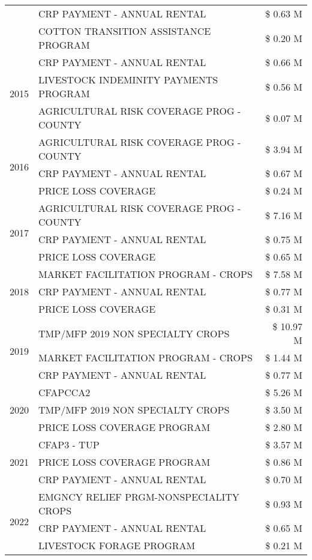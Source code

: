 \begin{tabular}{llr}
 & CRP PAYMENT - ANNUAL RENTAL & \$ 0.63 M \\
 & COTTON TRANSITION ASSISTANCE PROGRAM & \$ 0.20 M \\
\cline{1-3}
\multirow[t]{3}{*}{2015} & CRP PAYMENT - ANNUAL RENTAL & \$ 0.66 M \\
 & LIVESTOCK INDEMINITY PAYMENTS PROGRAM & \$ 0.56 M \\
 & AGRICULTURAL RISK COVERAGE PROG - COUNTY & \$ 0.07 M \\
\cline{1-3}
\multirow[t]{3}{*}{2016} & AGRICULTURAL RISK COVERAGE PROG - COUNTY & \$ 3.94 M \\
 & CRP PAYMENT - ANNUAL RENTAL & \$ 0.67 M \\
 & PRICE LOSS COVERAGE & \$ 0.24 M \\
\cline{1-3}
\multirow[t]{3}{*}{2017} & AGRICULTURAL RISK COVERAGE PROG - COUNTY & \$ 7.16 M \\
 & CRP PAYMENT - ANNUAL RENTAL & \$ 0.75 M \\
 & PRICE LOSS COVERAGE & \$ 0.65 M \\
\cline{1-3}
\multirow[t]{3}{*}{2018} & MARKET FACILITATION PROGRAM - CROPS & \$ 7.58 M \\
 & CRP PAYMENT - ANNUAL RENTAL & \$ 0.77 M \\
 & PRICE LOSS COVERAGE & \$ 0.31 M \\
\cline{1-3}
\multirow[t]{3}{*}{2019} & TMP/MFP 2019 NON SPECIALTY CROPS & \$ 10.97 M \\
 & MARKET FACILITATION PROGRAM - CROPS & \$ 1.44 M \\
 & CRP PAYMENT - ANNUAL RENTAL & \$ 0.77 M \\
\cline{1-3}
\multirow[t]{3}{*}{2020} & CFAPCCA2 & \$ 5.26 M \\
 & TMP/MFP 2019 NON SPECIALTY CROPS & \$ 3.50 M \\
 & PRICE LOSS COVERAGE PROGRAM & \$ 2.80 M \\
\cline{1-3}
\multirow[t]{3}{*}{2021} & CFAP3 - TUP & \$ 3.57 M \\
 & PRICE LOSS COVERAGE PROGRAM & \$ 0.86 M \\
 & CRP PAYMENT - ANNUAL RENTAL & \$ 0.70 M \\
\cline{1-3}
\multirow[t]{3}{*}{2022} & EMGNCY RELIEF PRGM-NONSPECIALITY CROPS & \$ 0.93 M \\
 & CRP PAYMENT - ANNUAL RENTAL & \$ 0.65 M \\
 & LIVESTOCK FORAGE PROGRAM & \$ 0.21 M \\
\cline{1-3}
\bottomrule
\end{tabular}
